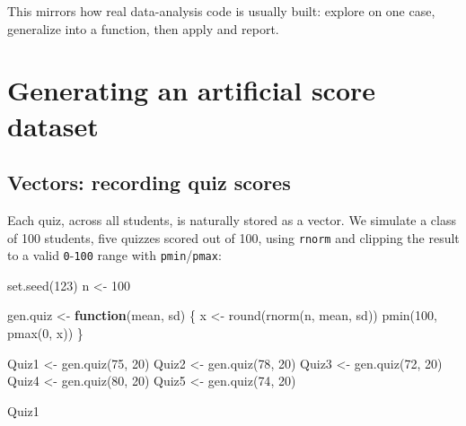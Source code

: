 \documentclass[
  letterpaper,
  DIV=11,
  numbers=noendperiod]{scrreprt}
\newenvironment{Shaded}{\begin{snugshade}}{\end{snugshade}}
\newcommand{\ControlFlowTok}[1]{\textcolor[rgb]{0.00,0.23,0.31}{\textbf{#1}}}
\newcommand{\DecValTok}[1]{\textcolor[rgb]{0.68,0.00,0.00}{#1}}
\newcommand{\FunctionTok}[1]{\textcolor[rgb]{0.28,0.35,0.67}{#1}}
\newcommand{\NormalTok}[1]{\textcolor[rgb]{0.00,0.23,0.31}{#1}}
\newcommand{\OtherTok}[1]{\textcolor[rgb]{0.00,0.23,0.31}{#1}}
\begin{document}
This mirrors how real data-analysis code is usually built: explore on
one case, generalize into a function, then apply and report.

\section{Generating an artificial score
dataset}\label{generating-an-artificial-score-dataset}

\subsection{Vectors: recording quiz
scores}\label{vectors-recording-quiz-scores}

Each quiz, across all students, is naturally stored as a vector. We
simulate a class of 100 students, five quizzes scored out of 100, using
\texttt{rnorm} and clipping the result to a valid
\texttt{0}-\texttt{100} range with \texttt{pmin}/\texttt{pmax}:

\begin{Shaded}
\begin{Highlighting}[]
\FunctionTok{set.seed}\NormalTok{(}\DecValTok{123}\NormalTok{)}
\NormalTok{n }\OtherTok{\textless{}{-}} \DecValTok{100}

\NormalTok{gen.quiz }\OtherTok{\textless{}{-}} \ControlFlowTok{function}\NormalTok{(mean, sd)}
\NormalTok{\{}
\NormalTok{    x }\OtherTok{\textless{}{-}} \FunctionTok{round}\NormalTok{(}\FunctionTok{rnorm}\NormalTok{(n, mean, sd))}
    \FunctionTok{pmin}\NormalTok{(}\DecValTok{100}\NormalTok{, }\FunctionTok{pmax}\NormalTok{(}\DecValTok{0}\NormalTok{, x))}
\NormalTok{\}}

\NormalTok{Quiz1 }\OtherTok{\textless{}{-}} \FunctionTok{gen.quiz}\NormalTok{(}\DecValTok{75}\NormalTok{, }\DecValTok{20}\NormalTok{)}
\NormalTok{Quiz2 }\OtherTok{\textless{}{-}} \FunctionTok{gen.quiz}\NormalTok{(}\DecValTok{78}\NormalTok{, }\DecValTok{20}\NormalTok{)}
\NormalTok{Quiz3 }\OtherTok{\textless{}{-}} \FunctionTok{gen.quiz}\NormalTok{(}\DecValTok{72}\NormalTok{, }\DecValTok{20}\NormalTok{)}
\NormalTok{Quiz4 }\OtherTok{\textless{}{-}} \FunctionTok{gen.quiz}\NormalTok{(}\DecValTok{80}\NormalTok{, }\DecValTok{20}\NormalTok{)}
\NormalTok{Quiz5 }\OtherTok{\textless{}{-}} \FunctionTok{gen.quiz}\NormalTok{(}\DecValTok{74}\NormalTok{, }\DecValTok{20}\NormalTok{)}

\NormalTok{Quiz1}
\end{Highlighting}
\end{Shaded}
\end{document}
